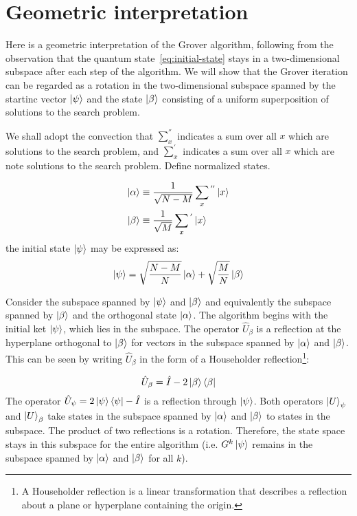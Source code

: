 \section{Geometric interpretation}\label{sec:geometric-interpretation}
Here is a geometric interpretation of the Grover algorithm, following from the observation that the quantum state~\ref{eq:initial-state} stays in a two-dimensional subspace after each step of the algorithm. We will show that the Grover iteration can be regarded as a rotation in the two-dimensional subspace spanned by the startinc vector $\ket{\psi}$ and the state $\ket{\beta}$ consisting of a uniform superposition of solutions to the search problem. 

We shall adopt the convection that $\sum_{x}^{''}$ indicates a sum over all $x$ which are solutions to the search problem, and $\sum_{x}^{'}$ indicates a sum over all $x$ which are note solutions to the search problem. Define normalized states.

\begin{equation*}
\begin{split}
 \ket{\alpha} &\equiv \frac{1}{\sqrt{N-M}} \sum_{x}{}^{''} \ket{x} \\
 \ket{\beta} &\equiv \frac{1}{\sqrt{M}} \sum_{x}{}^{'} \ket{x}
\end{split}
\end{equation*}
the initial state $\ket{\psi}$ may be expressed as:
\begin{equation*}
    \ket{\psi} = \sqrt{\frac{N-M}{N}} \ket{\alpha} + \sqrt{\frac{M}{N}} \ket{\beta}
\end{equation*}

Consider the subspace spanned by $\ket{\psi}$ and $\ket{\beta}$ and equivalently the subspace spanned by $\ket{\beta}$ and the orthogonal state $\ket{\alpha}$.
The algorithm begins with the initial ket $\ket{\psi}$, which lies in the subspace. The operator $\hat{U}_\beta$ is a reflection at the hyperplane orthogonal to $\ket{\beta}$ for vectors in the subspace spanned by $\ket{\alpha}$ and $\ket{\beta}$. This can be seen by writing $\hat{U}_\beta$ in the form of a Householder reflection\footnote{A Householder reflection is a linear transformation that describes a reflection about a plane or hyperplane containing the origin.}:

\begin{equation}
    \hat{U}_\beta = \hat{I} - 2 \ket{\beta}\bra{\beta}
\end{equation}
 The operator $\hat{U}_\psi = 2 \ket{\psi}\bra{\psi} - \hat{I}$ is a reflection through $\ket{\psi}$. Both operators $\ket{U}_\psi$ and $\ket{U}_\beta$ take states in the subspace spanned by $\ket{\alpha}$ and $\ket{\beta}$ to states in the subspace. The product of two reflections is a rotation. Therefore, the state space stays in this subspace for the entire algorithm (i.e. $G^k\ket{\psi}$ remains in the subspace spanned by $\ket{\alpha}$ and $\ket{\beta}$ for all $k$). 
 
